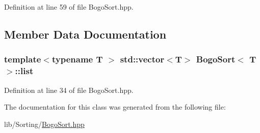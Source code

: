 Definition at line 59 of file Bogo\-Sort.\-hpp.



\subsection{Member Data Documentation}
\hypertarget{classBogoSort_ae72e81578cb2ad4e7122022d2dfffba8}{
\subsubsection[{list}]{\setlength{\rightskip}{0pt plus 5cm}template$<$typename T $>$ std\-::vector$<$T$>$ {\bf Bogo\-Sort}$<$ T $>$\-::list\hspace{0.3cm}{\ttfamily [private]}}}\label{classBogoSort_ae72e81578cb2ad4e7122022d2dfffba8}


Definition at line 34 of file Bogo\-Sort.\-hpp.



The documentation for this class was generated from the following file\-:\begin{DoxyCompactItemize}
\item 
lib/\-Sorting/\hyperlink{BogoSort_8hpp}{Bogo\-Sort.\-hpp}\end{DoxyCompactItemize}
